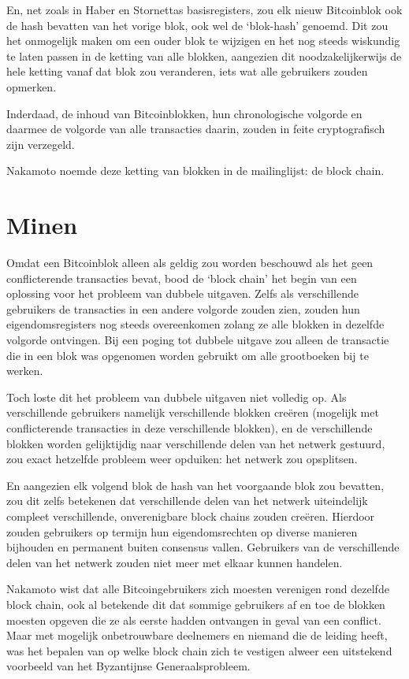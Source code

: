 \documentclass[smalldemyvopaper,11pt,twoside,onecolumn,openright,extrafontsizes,hidelinks]{memoir}
\begin{document}
En, net zoals in Haber en Stornettas basisregisters, zou elk nieuw
Bitcoinblok ook de hash bevatten van het vorige blok, ook wel de
`blok-hash' genoemd. Dit zou het onmogelijk maken om een ouder blok te
wijzigen en het nog steeds wiskundig te laten passen in de ketting van
alle blokken, aangezien dit noodzakelijkerwijs de hele ketting vanaf dat
blok zou veranderen, iets wat alle gebruikers zouden opmerken.

Inderdaad, de inhoud van Bitcoinblokken, hun chronologische volgorde en
daarmee de volgorde van alle transacties daarin, zouden in feite
cryptografisch zijn verzegeld.

Nakamoto noemde deze ketting van blokken in de mailinglijst: de block
chain.

\section{Minen}\label{minen}

Omdat een Bitcoinblok alleen als geldig zou worden beschouwd als het
geen conflicterende transacties bevat, bood de `block chain' het begin
van een oplossing voor het probleem van dubbele uitgaven. Zelfs als
verschillende gebruikers de transacties in een andere volgorde zouden
zien, zouden hun eigendomsregisters nog steeds overeenkomen zolang ze
alle blokken in dezelfde volgorde ontvingen. Bij een poging tot dubbele
uitgave zou alleen de transactie die in een blok was opgenomen worden
gebruikt om alle grootboeken bij te werken.

Toch loste dit het probleem van dubbele uitgaven niet volledig op. Als
verschillende gebruikers namelijk verschillende blokken creëren
(mogelijk met conflicterende transacties in deze verschillende blokken),
en de verschillende blokken worden gelijktijdig naar verschillende delen
van het netwerk gestuurd, zou exact hetzelfde probleem weer opduiken:
het netwerk zou opsplitsen.

En aangezien elk volgend blok de hash van het voorgaande blok zou
bevatten, zou dit zelfs betekenen dat verschillende delen van het
netwerk uiteindelijk compleet verschillende, onverenigbare block chains
zouden creëren. Hierdoor zouden gebruikers op termijn hun
eigendomsrechten op diverse manieren bijhouden en permanent buiten
consensus vallen. Gebruikers van de verschillende delen van het netwerk
zouden niet meer met elkaar kunnen handelen.

Nakamoto wist dat alle Bitcoingebruikers zich moesten verenigen rond
dezelfde block chain, ook al betekende dit dat sommige gebruikers af en
toe de blokken moesten opgeven die ze als eerste hadden ontvangen in
geval van een conflict. Maar met mogelijk onbetrouwbare deelnemers en
niemand die de leiding heeft, was het bepalen van op welke block chain
zich te vestigen alweer een uitstekend voorbeeld van het Byzantijnse
Generaalsprobleem.
\end{document}
